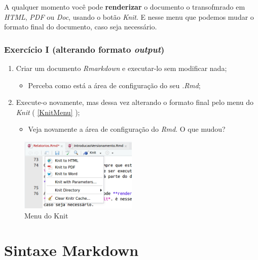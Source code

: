 \documentclass[]{book}
\providecommand{\tightlist}{%
  \setlength{\itemsep}{0pt}\setlength{\parskip}{0pt}}
\begin{document}
A qualquer momento você pode \textbf{renderizar} o documento o transofmrado em \emph{HTML}, \emph{PDF} ou \emph{Doc}, usando o botão \emph{Knit}. E nesse menu que podemos mudar o formato final do documento, caso seja necessário.

\hypertarget{ExI}{%
\subsection{\texorpdfstring{Exercício I (alterando formato \emph{output})}{Exercício I (alterando formato output)}}\label{ExI}}

\begin{enumerate}
\def\labelenumi{\arabic{enumi}.}
\tightlist
\item
  Criar um documento \emph{Rmarkdown} e executar-lo sem modificar nada;

  \begin{itemize}
  \tightlist
  \item
    Perceba como está a área de configuração do seu \emph{.Rmd};\\
  \end{itemize}
\item
  Execute-o novamente, mas dessa vez alterando o formato final pelo menu do \emph{Knit} ( \autoref{KnitMenu} );

  \begin{itemize}
  \tightlist
  \item
    Veja novamente a área de configuração do \emph{Rmd}. O que mudou?
  \end{itemize}
\end{enumerate}

\begin{figure}
\centering
\includegraphics[width=0.5\textwidth,height=\textheight]{./img/Knit.png}
\caption{Menu do Knit \label{KnitMenu}}
\end{figure}

\hypertarget{SintaxeMarkdown}{%
\chapter{Sintaxe Markdown}\label{SintaxeMarkdown}}
\end{document}

